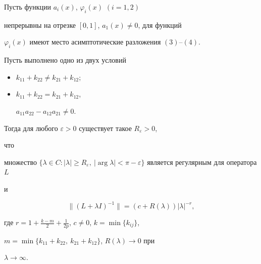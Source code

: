 \begin{thm} Пусть функции $a_i(x)$, $\varphi_i(x)$ $(i=1,2)$ 


непрерывны на отрезке $[0,1]$, $a_1(x)\ne0$, для функций  


$\varphi_i(x)$ имеют место асимптотические разложения $(3)$--$(4)$. 


Пусть выполнено одно из двух условий 


\begin{itemize} 


\item[А)] $k_{11}+k_{22}\ne k_{21}+k_{12};$ 


\item[Б)] $k_{11}+k_{22}=k_{21}+k_{12}$, 


$a_{11}a_{22}-a_{12}a_{21}\ne0$. 


\end{itemize} 


 


Тогда для любого $\varepsilon>0$ существует такое $R_\varepsilon>0$, 


что 


множество $\{\lambda\in C:|\lambda|\ge R_\varepsilon,\ 


|\arg\lambda|<\pi-\varepsilon\}$ является регулярным для оператора $L$ 


и 


\begin{equation} 


\|(L+\lambda I)^{-1}\|=(c+R(\lambda))|\lambda|^{-r}, 


\end{equation} 


где $r=1+\frac{k-m}{2}+\frac{1}{2p}$, $c\ne0$, $k=\min\{k_{ij}\}$, 


$m=\min\{k_{11}+k_{22},\ k_{21}+k_{12}\}$, $R(\lambda)\to 0$ при 


$\lambda\to\infty$. 


\end{thm} 


 



